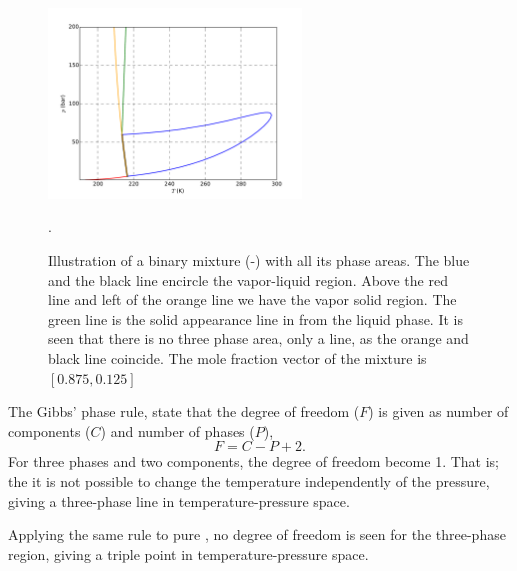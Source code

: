 \documentclass[internal,english]{sintefmemo2012}
\begin{document}
\begin{figure}[ht]
  \centering
  \includegraphics[width=0.6\textwidth]{envelope2}
  \caption{Illustration of a binary mixture (-) with all
    its phase areas. The blue and the black line encircle the
    vapor-liquid region. Above the red line and left of the orange
    line we have the vapor solid region. The green line is the solid
    appearance line in from the liquid phase. It is seen that there is
    no three phase area, only a line, as the orange and black line
    coincide. The mole fraction vector of the mixture is
    $\left[0.875,0.125\right]$}.
  \label{fig:envelope2}
\end{figure}

The Gibbs' phase rule, state that the degree of freedom ($F$) is given
as number of components ($C$) and number of phases ($P$),
\begin{equation}
  F = C - P + 2.
\end{equation}
For three phases and two components, the degree of freedom
become 1. That is; the it is not possible to change the temperature
independently of the pressure, giving a three-phase line in
temperature-pressure space.

Applying the same rule to pure , no degree of freedom is seen
for the three-phase region, giving a triple point in
temperature-pressure space.

\clearpage


\end{document}
